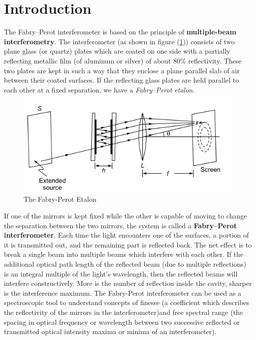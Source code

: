 \documentclass{article}
\begin{document}
\section{Introduction}
\noindent The Fabry–Perot interferometer is based on the principle of \textbf{multiple-beam interferometry}. The interferometer (as shown in figure (\ref{fig:etalon})) consists of two plane glass (or quartz) plates which are coated on one side with a partially reflecting metallic film (of aluminum or silver) of about $80\%$ reflectivity. These two plates are kept in such a way that they enclose a plane parallel slab of air between their coated surfaces. If the reflecting glass plates are held parallel to each other at a fixed separation, we have a \textit{Fabry–Perot etalon}. 
\begin{figure}[h!]
    \centering
    \includegraphics[scale = 0.85]{Figures/fabry perot etalon.png}
    \caption{The Fabry-Perot Etalon}
    \label{fig:etalon}
\end{figure}
\par
\noindent
If one of the mirrors is kept fixed while the other is capable of moving to change the separation between the two mirrors, the system is called a \textbf{Fabry–Perot interferometer}. Each time the light encounters one of the surfaces, a portion of it is transmitted out, and the remaining part is reflected back. The net effect is to break a single beam into multiple beams which interfere with each other. If the additional optical path length of the reflected beam (due to multiple reflections) is an integral multiple of the light's wavelength, then the reflected beams will interfere constructively. More is the number of reflection inside the cavity, sharper is the interference maximum. The Fabry-Perot interferometer can be used as a spectroscopic tool to understand concepts of finesse (a coefficient which describes the reflectivity of the mirrors in the interferometer)and free spectral range (the spacing in optical frequency or wavelength between two successive reflected or transmitted optical intensity maxima or minima of an interferometer).
\end{document}
